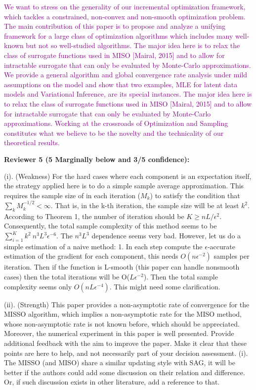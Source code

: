 \documentclass{article} %
\theoremstyle{t}
\begin{document}
\textcolor{purple}{
We want to stress on the generality of our incremental optimization framework, which tackles a constrained, non-convex and non-smooth optimization problem. 
The main contribution of this paper is to propose and analyze a unifying framework for a large class of optimization algorithms which includes many well-known but not so well-studied algorithms.
The major idea here is to relax the class of surrogate functions used in MISO [Mairal, 2015] and to allow for intractable surrogate that can only be evaluated by Monte-Carlo approximations.
We provide a general algorithm and global convergence rate analysis under mild assumptions on the model and show that two examples, MLE for latent data models and Variational Inference, are its special instances.
The major idea here is to relax the class of surrogate functions used in MISO [Mairal, 2015] and to allow for intractable surrogate that can only be evaluated by Monte-Carlo approximations.
Working at the crossroads of Optimization and Sampling constitutes what we believe to be the novelty and the technicality of our theoretical results.
}



\textbf{Reviewer 5 (5 Marginally below and 3/5 confidence):}

(i). (Weakness) For the hard cases where each component is an expectation itself, the strategy applied here is to do a simple sample average approximation. This requires the sample size of in each iteration ($M_k$) to satisfy the condition that $\sum_k M_k^{-1/2}<\infty$. That is, in the k-th iteration, the sample size will be at least $k^2$. According to Theorem 1, the number of iteration should be $K\geq nL/\epsilon^2$. Consequently, the total sample complexity of this method seems to be $ \sum_{i=1}^{K} k^2 ~ n^3L^3\epsilon^{-6}$. The 
$n^3L^3$ dependence seems very bad. However, let us do a simple estimation of a naive method: 1. In each step compute the $\epsilon$-accurate estimation of the gradient for each component, this needs $O(n \epsilon^{-2})$ samples per iteration. Then if the function is L-smooth (this paper can handle nonsmooth cases) then the total iterations will be O($L\epsilon^{-2}$). Then the total sample complexity seems only $O(nL\epsilon^{-4})$. This might need some clarification.
 
(ii). (Strength) This paper provides a non-asymptotic rate of convergence for the MISSO algorithm, which implies a non-asymptotic rate for the MISO method, whose non-asymptotic rate is not known before, which should be appreciated. Moreover, the numerical experiment in this paper is well presented.
Provide additional feedback with the aim to improve the paper. Make it clear that these points are here to help, and not necessarily part of your decision assessment.
(i). The MISSO (and MISO) share a similar updating style with SAG, it will be better if the authors could add some discussion on their relation and difference. Or, if such discussion exists in other literature, add a reference to that.
\end{document}
